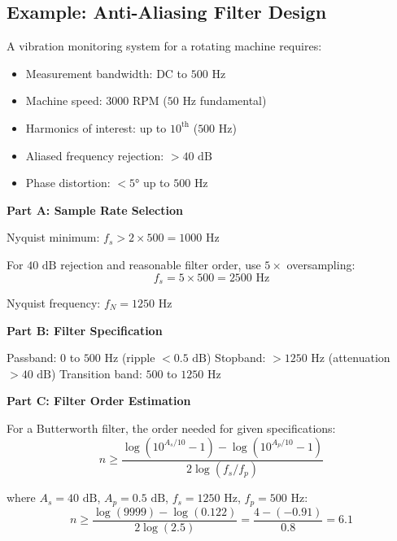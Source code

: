 \subsection{Example: Anti-Aliasing Filter Design}
\label{ex:aa_design}

\begin{example}

A vibration monitoring system for a rotating machine requires:
\begin{itemize}
    \item Measurement bandwidth: DC to $500\text{ Hz}$
    \item Machine speed: $3000\text{ RPM}$ ($50\text{ Hz}$ fundamental)
    \item Harmonics of interest: up to $10^{\text{th}}$ ($500\text{ Hz}$)
    \item Aliased frequency rejection: $>40\text{ dB}$
    \item Phase distortion: $<5°$ up to $500\text{ Hz}$
\end{itemize}

\textbf{Part A: Sample Rate Selection}

Nyquist minimum: $f_s > 2 \times 500 = 1000\text{ Hz}$

For $40\text{ dB}$ rejection and reasonable filter order, use $5\times$ oversampling:
\begin{equation}
f_s = 5 \times 500 = 2500\text{ Hz}
\end{equation}

Nyquist frequency: $f_N = 1250\text{ Hz}$

\textbf{Part B: Filter Specification}

Passband: $0$ to $500\text{ Hz}$ (ripple $<0.5\text{ dB}$)
Stopband: $>1250\text{ Hz}$ (attenuation $>40\text{ dB}$)
Transition band: $500$ to $1250\text{ Hz}$

\textbf{Part C: Filter Order Estimation}

For a Butterworth filter, the order needed for given specifications:
\begin{equation}
n \geq \frac{\log(10^{A_s/10} - 1) - \log(10^{A_p/10} - 1)}{2\log(f_s/f_p)}
\end{equation}

where $A_s = 40\text{ dB}$, $A_p = 0.5\text{ dB}$, $f_s = 1250\text{ Hz}$, $f_p = 500\text{ Hz}$:
\begin{equation}
n \geq \frac{\log(9999) - \log(0.122)}{2\log(2.5)} = \frac{4 - (-0.91)}{0.8} = 6.1
\end{equation}


\end{example}
